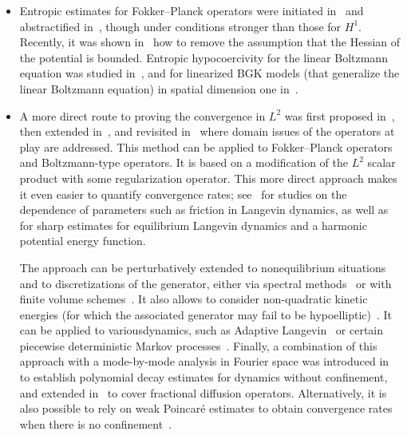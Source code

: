 \documentclass[10pt]{amsart}
\theoremstyle{definition}\newtheorem{defi}[theo]{Definition}\newtheorem{rema}[theo]{Remark}\newtheorem{exam}[theo]{Example}\newtheorem{exem}[theo]{Example}\newtheorem{nota}[theo]{Notation}
\begin{document}
\begin{itemize}
Exponential convergence in $H^1$ can be established using only $L^2$ bounds on the initial data by hypoelliptic regularization~\cite{Herau07}. The latter technique can also be adapted to discretization schemes~\cite{PZ17}.

\item Entropic estimates for Fokker--Planck operators were initiated in~\cite{DV01} and abstractified in~\cite{Villani09}, though under conditions stronger than those for $H^1$. Recently, it was shown in~\cite{CGMZ19} how to remove the assumption that the Hessian of the potential is bounded. Entropic hypocoercivity for the linear Boltzmann equation was studied in~\cite{Ev17,Mon17}, and for linearized BGK models (that generalize the linear Boltzmann equation) in spatial dimension one in~\cite{AAC16}.

\item A more direct route to proving the convergence in $L^2$ was first proposed in~\cite{Herau06}, then extended in~\cite{DMS09,DMS15}, and revisited in~\cite{GS16} where domain issues of the operators at play are addressed. This method can be applied to Fokker--Planck operators and Boltzmann-type operators. It is based on a modification of the $L^2$ scalar product with some regularization operator. This more direct approach makes it even easier to quantify convergence rates; see~\cite{DKMS13,GS16} for studies on the dependence of parameters such as friction in Langevin dynamics, as well as~\cite{AAS15,ASS20} for sharp estimates for equilibrium Langevin dynamics and a harmonic potential energy function.

The approach can be perturbatively extended to nonequilibrium situations~\cite{BHM17,IOS19,SV18} and to discretizations of the generator, either via spectral methods~\cite{RS18} or with finite volume schemes~\cite{BCHR19}. It also allows to consider non-quadratic kinetic energies (for which the associated generator may fail to be hypoelliptic)~\cite{ST18}. It can be applied to various\linebreak dynamics, such as Adaptive Langevin~\cite{LSS19} or certain piecewise deterministic Markov processes~\cite{ADNR18}. Finally, a combination of this approach with a mode-by-mode analysis in Fourier space was introduced in~\cite{BDMMS17} to establish polynomial decay estimates for dynamics without confinement, and extended in~\cite{BDLS19} to cover fractional diffusion operators. Alternatively, it is also possible to rely on weak Poincaré estimates to obtain convergence rates when there is no confinement~\cite{GW19}.


\end{itemize}
\end{document}
